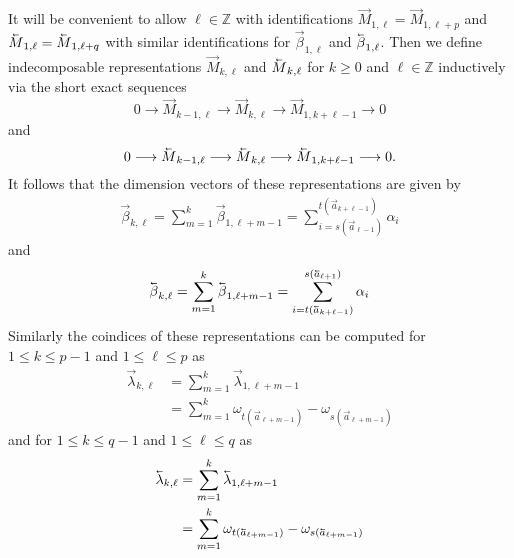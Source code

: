 \documentclass[11pt]{amsart}
\newcommand{\ZZ}{\mathbb{Z}}
\newcommand{\cev}[1]{\reflectbox{\!\ensuremath{\vec{\,\reflectbox{\ensuremath{#1}}}}}}
\newcommand{\scev}[1]{\reflectbox{\scriptsize\!\ensuremath{\vec{\,\reflectbox{\ensuremath{#1}}}}}}
\numberwithin{equation}{section}
\begin{document}
  It will be convenient to allow $\ell\in\ZZ$ with identifications $\vec{M}_{1,\ell}=\vec{M}_{1,\ell+p}$ and $\cev{M}_{1,\ell}=\cev{M}_{1,\ell+q}$ with similar identifications for $\vec{\beta}_{1,\ell}$ and $\cev{\beta}_{1,\ell}$.  Then we define indecomposable representations $\vec{M}_{k,\ell}$ and $\cev{M}_{k,\ell}$ for $k\ge0$ and $\ell\in\ZZ$ inductively via the short exact sequences
  \[0\longrightarrow\vec{M}_{k-1,\ell}\longrightarrow\vec{M}_{k,\ell}\longrightarrow\vec{M}_{1,k+\ell-1}\longrightarrow0\]
  and
  \[0\longrightarrow\cev{M}_{k-1,\ell}\longrightarrow\cev{M}_{k,\ell}\longrightarrow\cev{M}_{1,k+\ell-1}\longrightarrow0.\]
  It follows that the dimension vectors of these representations are given by
  \begin{align}
    \vec\beta_{k,\ell}=\sum_{m=1}^k\vec\beta_{1,\ell+m-1}=\sum_{i=s(\vec{a}_{\ell-1})}^{t(\vec{a}_{k+\ell-1})}\alpha_i
  \end{align}
  and
  \begin{align}
    \cev\beta_{k,\ell}=\sum\limits_{m=1}^k\cev\beta_{1,\ell+m-1}=\sum_{i=t(\scev{a}_{k+\ell-1})}^{s(\scev{a}_{\ell+1})}\alpha_i
  \end{align}
  Similarly the coindices of these representations can be computed for $1\le k\le p-1$ and $1\le\ell\le p$ as
  \begin{align}
    \vec\lambda_{k,\ell}
    &=\sum\limits_{m=1}^k\vec\lambda_{1,\ell+m-1}\\
    &=\sum\limits_{m=1}^k\omega_{t(\vec{a}_{\ell+m-1})}-\omega_{s(\vec{a}_{\ell+m-1})}
  \end{align}
  and for $1\le k\le q-1$ and $1\le\ell\le q$ as
  \begin{align}
    \cev\lambda_{k,\ell}
    &=\sum\limits_{m=1}^k\cev\lambda_{1,\ell+m-1}\quad\text{}\\
    &=\sum\limits_{m=1}^k\omega_{t(\scev{a}_{\ell+m-1})}-\omega_{s(\scev{a}_{\ell+m-1})}
  \end{align}
\end{document}
